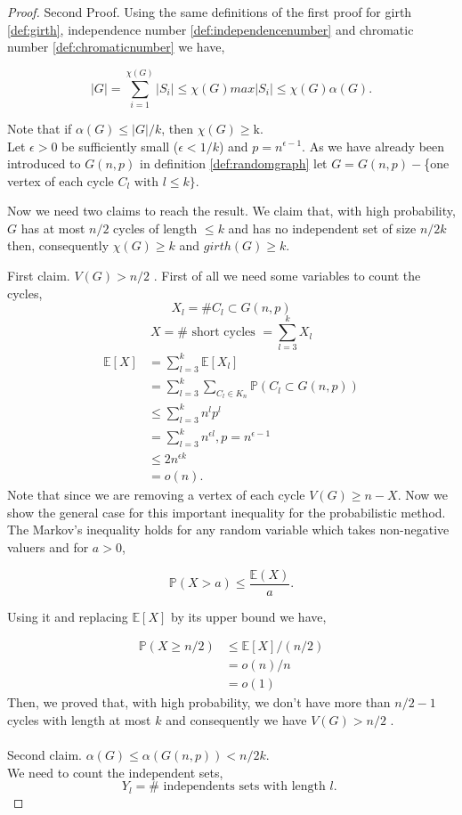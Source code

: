 \documentclass[12pt,twoside,a4paper]{book}
\numberwithin{equation}{section}
\theoremstyle{remark}
\begin{document}
\begin{proof}
Second Proof. Using the same definitions of the first proof for girth \ref{def:girth}, independence number \ref{def:independencenumber} and chromatic number \ref{def:chromaticnumber} we have,

$$ |G| = \sum_{i=1}^{\chi(G)} |S_i| \leq \chi(G)max|S_i| \leq \chi(G) \alpha (G) .$$

Note that if $\alpha(G) \leq |G|/k$, then $\chi(G) \geq $k. \\
Let $\epsilon > 0$ be sufficiently small ($\epsilon < 1/k$) and $p = n^{\epsilon - 1}$. As we have already been introduced to $G(n,p)$ in definition \ref{def:randomgraph} let $G = G(n,p) -$\{one vertex of each cycle $C_l \text{ with } l\leq k\}$.

Now we need two claims to reach the result. We claim that, with high probability, $G$ has at most $n/2$ cycles of length $\leq k$ and has no independent set  of size $n/2k$ then, consequently $\chi(G) \geq k$ and $girth(G) \geq k$.

First claim. $V(G) > n/2$ . First of all we need some variables to count the cycles,
$$X_l = \# C_l \subset G(n,p)$$
$$X = \# \text{ short cycles } = \sum_{l=3}^k X_l$$
\begin{align*}
\mathbb{E}[X] &= \sum_{l=3}^k \mathbb{E}[X_l] \\
	       &= \sum_{l=3}^k \sum_{C_l \in K_n} \mathbb{P}(C_l \subset G(n,p))\\
	       &\leq \sum_{l=3}^k n^l p^l \\
	       &= \sum_{l=3}^k n^{\epsilon l}, p= n^{\epsilon - 1}\\
	       &\leq 2n^{\epsilon k} \\
	       &= o(n).
\end{align*}
Note that since we are removing a vertex of each cycle $V(G) \geq n-X$. Now we show the general case for this important inequality for the probabilistic method. The Markov's inequality holds for any random variable which takes non-negative valuers and for $a>0$,

$$\mathbb{P}(X>a) \leq \frac{\mathbb{E}(X)}{a}.$$

Using it and replacing $\mathbb{E}[X]$ by its upper bound we have,

\begin{align*}
\mathbb{P}(X\geq n/2) &\leq \mathbb{E}[X]/(n/2)\\
		& = o(n)/n\\
		& = o(1)
\end{align*}
Then, we proved that, with high probability, we don't have more than $n/2 -1$ cycles with length at most $k$ and consequently we have $V(G) > n/2$ .\\
\\
Second claim. $\alpha(G) \leq \alpha (G(n,p)) < n/2k$.\\
We need to count the independent sets,
$$Y_l = \# \text{ independents sets with length $l$. }$$


\end{proof}
\end{document}
